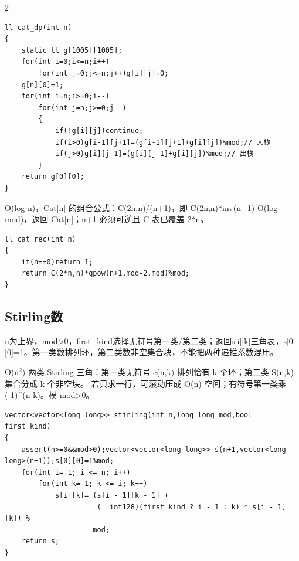 \documentclass[UTF8,fontset=fandol,a4paper,twoside]{ctexart}
\newcommand{\note}[1]{{\fontsize{10}{12}\selectfont #1\par}}
\begin{document}
\begin{multicols}{2}
\begin{lstlisting}
ll cat_dp(int n)
{
    static ll g[1005][1005];
    for(int i=0;i<=n;i++)
        for(int j=0;j<=n;j++)g[i][j]=0;
    g[n][0]=1;
    for(int i=n;i>=0;i--)
        for(int j=n;j>=0;j--)
        {
            if(!g[i][j])continue;
            if(i>0)g[i-1][j+1]=(g[i-1][j+1]+g[i][j])%mod;// 入栈
            if(j>0)g[i][j-1]=(g[i][j-1]+g[i][j])%mod;// 出栈
        }
    return g[0][0];
}
\end{lstlisting}
\note{O(\allowbreak{}log n)\allowbreak{}，Cat[\allowbreak{}n]\allowbreak{} 的组合公式：C(\allowbreak{}2n,\allowbreak{}n)\allowbreak{}/\allowbreak{}(\allowbreak{}n+\allowbreak{}1)\allowbreak{}，即 C(\allowbreak{}2n,\allowbreak{}n)\allowbreak{}*inv(\allowbreak{}n+\allowbreak{}1)\allowbreak{} O(\allowbreak{}log mod)\allowbreak{}，返回 Cat[\allowbreak{}n]\allowbreak{}；n+\allowbreak{}1 必须可逆且 C 表已覆盖 2*n。}
\begin{lstlisting}
ll cat_rec(int n)
{
    if(n==0)return 1;
    return C(2*n,n)*qpow(n+1,mod-2,mod)%mod;
}
\end{lstlisting}
\subsection{Stirling数}

\note{n为上界，mod>\allowbreak{}0，first\_kind选择无符号第一类/\allowbreak{}第二类；返回s[\allowbreak{}i]\allowbreak{}[\allowbreak{}k]\allowbreak{}三角表，s[\allowbreak{}0]\allowbreak{}[\allowbreak{}0]\allowbreak{}=\allowbreak{}1。第一类数排列环，第二类数非空集合块，不能把两种递推系数混用。}
\note{O(\allowbreak{}n\ensuremath{^2})\allowbreak{} 两类 Stirling 三角：第一类无符号 c(\allowbreak{}n,\allowbreak{}k)\allowbreak{} 排列恰有 k 个环；第二类 S(\allowbreak{}n,\allowbreak{}k)\allowbreak{} 集合分成 k 个非空块。 若只求一行，可滚动压成 O(\allowbreak{}n)\allowbreak{} 空间；有符号第一类乘 (\allowbreak{}-\allowbreak{}1)\allowbreak{}\textasciicircum{}(\allowbreak{}n-\allowbreak{}k)\allowbreak{}。模 mod>\allowbreak{}0。}
\begin{lstlisting}
vector<vector<long long>> stirling(int n,long long mod,bool first_kind)
{
    assert(n>=0&&mod>0);vector<vector<long long>> s(n+1,vector<long long>(n+1));s[0][0]=1%mod;
    for(int i= 1; i <= n; i++)
        for(int k= 1; k <= i; k++)
            s[i][k]= (s[i - 1][k - 1] +
                      (__int128)(first_kind ? i - 1 : k) * s[i - 1][k]) %
                     mod;
    return s;
}
\end{lstlisting}

\end{multicols}
\end{document}
